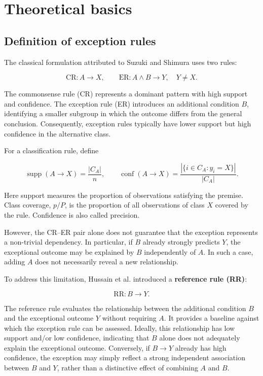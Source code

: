 \section{Theoretical basics}
\label{supplement-theory}




\subsection{Definition of exception rules}
\label{suzuki-s-formulation-and-the-reference-rule}

The classical formulation attributed to Suzuki and Shimura
\cite{Suzuki1996} uses two rules:

\[
\mathrm{CR}: A\to X, \qquad
\mathrm{ER}: A\land B\to Y, \quad Y\ne X.
\]

The commonsense rule (CR) represents a dominant pattern with high
support and confidence. The exception rule (ER) introduces an
additional condition \(B\), identifying a smaller subgroup in which
the outcome differs from the general conclusion. Consequently,
exception rules typically have lower support but high confidence
in the alternative class.

For a classification rule, define

\[
\operatorname{supp}(A\to X)
  =\frac{|C_A|}{n},\qquad
\operatorname{conf}(A\to X)
  =\frac{|\{i\in C_A:y_i=X\}|}{|C_A|}.
\]

Here support measures the proportion of observations satisfying
the premise. Class coverage, \(p/P\), is the proportion of all
observations of class \(X\) covered by the rule.
Confidence is also called precision.

However, the CR--ER pair alone does not guarantee that the
exception represents a non-trivial dependency. In particular,
if \(B\) already strongly predicts \(Y\), the exceptional
outcome may be explained by \(B\) independently of \(A\).
In such a case, adding \(A\) does not necessarily reveal
a new relationship.

To address this limitation, Hussain et al. \cite{Hussain2000}
introduced a \textbf{reference rule (RR)}:

\[
\mathrm{RR}: B\to Y.
\]

The reference rule evaluates the relationship between the
additional condition \(B\) and the exceptional outcome \(Y\)
without requiring \(A\). It provides a baseline against which
the exception rule can be assessed. Ideally, this relationship
has low support and/or low confidence, indicating that \(B\)
alone does not adequately explain the exceptional outcome.
Conversely, if \(B\to Y\) already has high confidence, the
exception may simply reflect a strong independent association
between \(B\) and \(Y\), rather than a distinctive effect
of combining \(A\) and \(B\).


